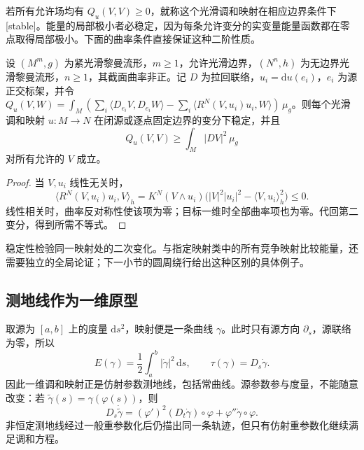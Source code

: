 \ProseParagraphBreak

若所有允许场均有 \(Q_u(V,V)\ge0\)，就称这个光滑调和映射在相应边界条件下[stable]。能量的局部极小者必稳定，因为每条允许变分的实变量能量函数都在零点取得局部极小。下面的曲率条件直接保证这种二阶性质。
\begin{corollary}\label{g3:cor:harmonic-map-nonpositive-stability}
	设 \((M^m,g)\) 为紧光滑黎曼流形，\(m\ge1\)，允许光滑边界，\((N^n,h)\) 为无边界光滑黎曼流形，\(n\ge1\)，其截面曲率非正。记 \(D\) 为拉回联络，\(u_i=\mathrm du(e_i)\)，\(e_i\) 为源正交标架，并令 \(Q_u(V,W)=\int_M(\sum_i\langle D_{e_i}V,D_{e_i}W\rangle-\sum_i\langle R^N(V,u_i)u_i,W\rangle)\,\mu_g\)。则每个光滑调和映射 \(u:M\to N\) 在闭源或逐点固定边界的变分下稳定，并且
	\[
		Q_u(V,V)\ge\int_M|DV|^2\,\mu_g
	\]
	对所有允许的 \(V\) 成立。
\end{corollary}
\begin{proof}
	当 \(V,u_i\) 线性无关时，
	\[
		\langle R^N(V,u_i)u_i,V\rangle_h
		=K^N(V\wedge u_i)\bigl(|V|^2|u_i|^2-\langle V,u_i\rangle_h^2\bigr)\le0.
	\]
	线性相关时，曲率反对称性使该项为零；目标一维时全部曲率项也为零。代回第二变分，得到所需不等式。
\end{proof}

稳定性检验同一映射处的二次变化。与指定映射类中的所有竞争映射比较能量，还需要独立的全局论证；下一小节的圆周绕行给出这种区别的具体例子。

\subsection{测地线作为一维原型}
\label{g3:subsec:1801:04}
取源为 \([a,b]\) 上的度量 \(\mathrm ds^2\)，映射便是一条曲线 \(\gamma\)。此时只有源方向 \(\partial_s\)，源联络为零，所以
\[
	E(\gamma)=\frac12\int_a^b|\dot\gamma|^2\,\mathrm ds,
	\qquad \tau(\gamma)=D_s\dot\gamma.
\]
因此一维调和映射正是仿射参数测地线，包括常曲线。源参数参与度量，不能随意改变：若 \(\widetilde\gamma(s)=\gamma(\varphi(s))\)，则
\[
	D_s\dot{\widetilde\gamma}
	=(\varphi')^2(D_t\dot\gamma)\circ\varphi
	+\varphi''\dot\gamma\circ\varphi.
\]
非恒定测地线经过一般重参数化后仍描出同一条轨迹，但只有仿射重参数化继续满足调和方程。

\ProseParagraphBreak

